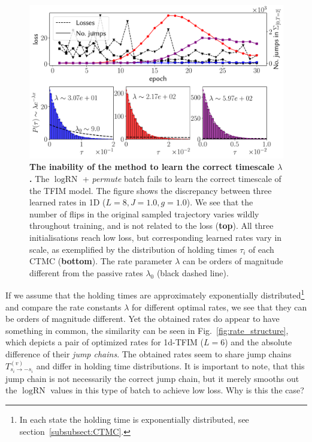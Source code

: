 \begin{figure}[t]
	\centering
	\includegraphics[width=\linewidth]{Chapter5/Figs/Vector/scale_blowup}
	\caption[The inability of the method to learn the correct timescale $\lambda$]{\textbf{The inability of the method to learn the correct timescale $\lambda$.} The $\log \text{RN}$ + \emph{permute} batch fails to learn the correct timescale of the TFIM model. The figure shows the discrepancy between three learned rates in 1D ($L=8, J=1.0, g=1.0$). We see that the number of flips in the original sampled trajectory varies wildly throughout training, and is not related to the loss (\textbf{top}). All three initialisations reach low loss, but corresponding learned rates vary in scale, as exemplified by the distribution of holding times $\tau_i$ of each CTMC (\textbf{bottom}). The rate parameter $\lambda$ can be orders of magnitude different from the passive rates $\lambda_0$ (black dashed line).}
	\label{fig:scaleblowup}
\end{figure}
If we assume that the holding times are approximately exponentially distributed\footnote{In each state the holding time is exponentially distributed, see section~\ref{subsubsect:CTMC}.} and compare the rate constants $\lambda$ for different optimal rates, we see that they can be orders of magnitude different. Yet the obtained rates do appear to have something in common, the similarity can be seen in Fig.~\ref{fig:rate_structure}, which depicts a pair of optimized rates for 1d-TFIM ($L=6$) and the absolute difference of their \emph{jump chains}. The obtained rates seem to share jump chains $T^{(v)}_{s_i \rightarrow -s_i}$ and differ in holding time distributions. It is important to note, that this jump chain is not necessarily the correct jump chain, but it merely smooths out the $\log \text{RN}$ values in this type of batch to achieve low loss. Why is this the case?
